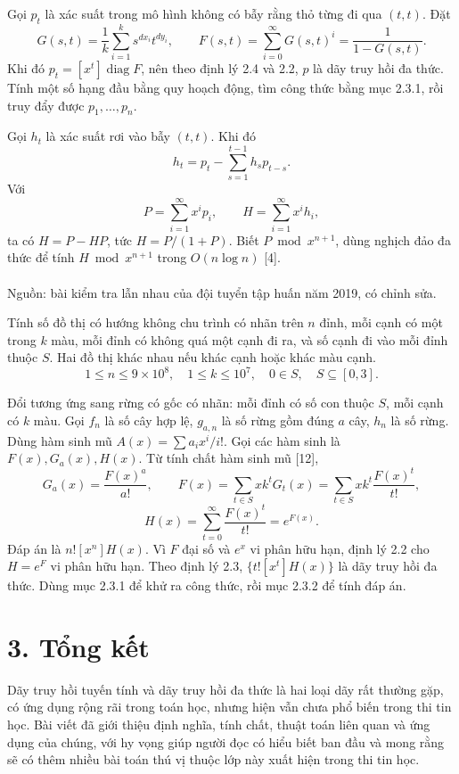 \documentclass[11pt]{article}
\DeclareMathOperator{\diag}{diag}
\begin{document}
Gọi \(p_t\) là xác suất trong mô hình không có bẫy rằng thỏ từng đi qua
\((t,t)\). Đặt
\[
  G(s,t)=\frac{1}{k}\sum_{i=1}^{k}s^{dx_i}t^{dy_i},\qquad
  F(s,t)=\sum_{i=0}^{\infty}G(s,t)^i=\frac{1}{1-G(s,t)}.
\]
Khi đó \(p_t=[x^t]\diag F\), nên theo định lý 2.4 và 2.2, \(p\) là dãy truy
hồi đa thức. Tính một số hạng đầu bằng quy hoạch động, tìm công thức bằng mục
2.3.1, rồi truy đẩy được \(p_1,\ldots,p_n\).

Gọi \(h_t\) là xác suất rơi vào bẫy \((t,t)\). Khi đó
\[
  h_t=p_t-\sum_{s=1}^{t-1}h_sp_{t-s}.
\]
Với
\[
  P=\sum_{i=1}^{\infty}x^ip_i,\qquad
  H=\sum_{i=1}^{\infty}x^ih_i,
\]
ta có \(H=P-HP\), tức \(H=P/(1+P)\). Biết \(P\bmod x^{n+1}\), dùng nghịch đảo
đa thức để tính \(H\bmod x^{n+1}\) trong \(O(n\log n)\) [4].

\paragraph{}
Nguồn: bài kiểm tra lẫn nhau của đội tuyển tập huấn năm 2019, có chỉnh sửa.

Tính số đồ thị có hướng không chu trình có nhãn trên \(n\) đỉnh, mỗi cạnh có
một trong \(k\) màu, mỗi đỉnh có không quá một cạnh đi ra, và số cạnh đi vào
mỗi đỉnh thuộc \(S\). Hai đồ thị khác nhau nếu khác cạnh hoặc khác màu cạnh.
\[
  1\le n\le9\times10^8,\quad 1\le k\le10^7,\quad 0\in S,\quad S\subseteq[0,3].
\]

Đổi tương ứng sang rừng có gốc có nhãn: mỗi đỉnh có số con thuộc \(S\), mỗi
cạnh có \(k\) màu. Gọi \(f_n\) là số cây hợp lệ, \(g_{a,n}\) là số rừng gồm
đúng \(a\) cây, \(h_n\) là số rừng. Dùng hàm sinh mũ \(A(x)=\sum a_i x^i/i!\).
Gọi các hàm sinh là \(F(x),G_a(x),H(x)\). Từ tính chất hàm sinh mũ [12],
\[
  G_a(x)=\frac{F(x)^a}{a!},\qquad
  F(x)=\sum_{t\in S}xk^tG_t(x)
      =\sum_{t\in S}xk^t\frac{F(x)^t}{t!},
\]
\[
  H(x)=\sum_{t=0}^{\infty}\frac{F(x)^t}{t!}=e^{F(x)}.
\]
Đáp án là \(n![x^n]H(x)\). Vì \(F\) đại số và \(e^x\) vi phân hữu hạn, định
lý 2.2 cho \(H=e^F\) vi phân hữu hạn. Theo định lý 2.3,
\(\{t![x^t]H(x)\}\) là dãy truy hồi đa thức. Dùng mục 2.3.1 để khử ra công
thức, rồi mục 2.3.2 để tính đáp án.

\section*{3. Tổng kết}

Dãy truy hồi tuyến tính và dãy truy hồi đa thức là hai loại dãy rất thường
gặp, có ứng dụng rộng rãi trong toán học, nhưng hiện vẫn chưa phổ biến trong
thi tin học. Bài viết đã giới thiệu định nghĩa, tính chất, thuật toán liên
quan và ứng dụng của chúng, với hy vọng giúp người đọc có hiểu biết ban đầu và
mong rằng sẽ có thêm nhiều bài toán thú vị thuộc lớp này xuất hiện trong thi
tin học.
\end{document}
